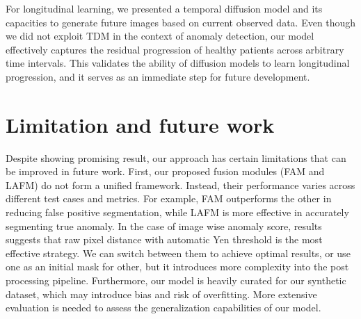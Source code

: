 For longitudinal learning, we presented a temporal diffusion model and its capacities to generate future images based on current observed data. Even though we did not exploit TDM in the context of anomaly detection, our model effectively captures the residual progression of healthy patients across arbitrary time intervals. This validates the ability of diffusion models to learn longitudinal progression, and it serves as an immediate step for future development. 

\section{Limitation and future work}
\label{sec:limitation}

Despite showing promising result, our approach has certain limitations that can be improved in future work. First, our proposed fusion modules (FAM and LAFM) do not form a unified framework. Instead, their performance varies across different test cases and metrics. For example, FAM outperforms the other in reducing false positive segmentation, while LAFM is more effective in accurately segmenting true anomaly. In the case of image wise anomaly score, results suggests that raw pixel distance with automatic Yen threshold is the most effective strategy. We can switch between them to achieve optimal results, or use one as an initial mask for other, but it introduces more complexity into the post processing pipeline. Furthermore, our model is heavily curated for our synthetic dataset, which may introduce bias and risk of overfitting. More extensive evaluation is needed to assess the generalization capabilities of our model.

